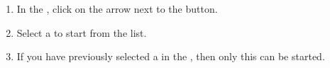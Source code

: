 

\begin{enumerate}
\item In the \gdtestsuitebrowser{}, click on the arrow next to the  button. 
\item Select a \gdjob{} to start from the list. 
\item If you have previously selected a \gdjob{} in the \gdtestsuitebrowser{}, then only this \gdjob{} can be started. 
\end{enumerate}



